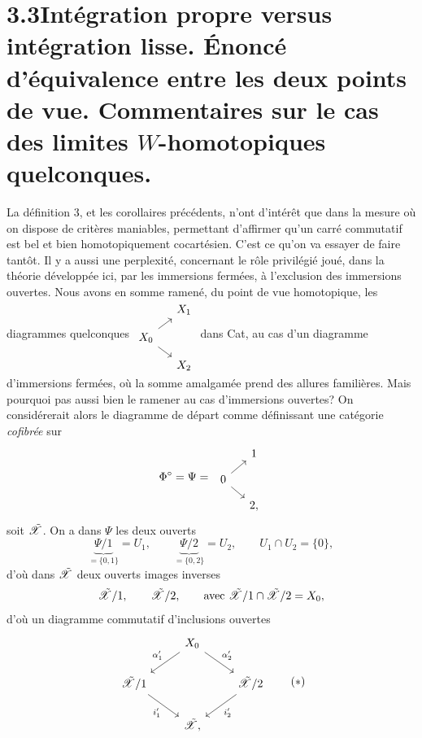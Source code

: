 \section*{3.3\quad Intégration propre versus intégration lisse. Énoncé d'équivalence entre les deux points de vue. Commentaires sur le cas des limites $W$-homotopiques quelconques.}

La définition 3, et les corollaires précédents, n'ont d'intérêt que dans la mesure où on dispose de critères maniables, permettant d'affirmer qu'un carré commutatif est bel et bien homotopiquement cocartésien. C'est ce qu'on va essayer de faire tantôt. Il y a aussi une perplexité, concernant le rôle privilégié joué, dans la théorie développée ici, par les immersions fermées, à l'exclusion des immersions ouvertes. Nous avons en somme ramené, du
point de vue homotopique, les diagrammes quelconques $\begin{tikzcd}[row sep=small, column sep=small]
 & X_1 \\
X_0 \arrow[ur] \arrow[dr] & \\
 & X_2
\end{tikzcd}$ dans Cat, au cas d'un diagramme d'immersions fermées, où la somme amalgamée prend des allures familières. Mais pourquoi pas aussi bien le ramener au cas d'immersions ouvertes? On considérerait alors le diagramme de départ comme définissant une catégorie \textit{cofibrée} sur
\[
\Phi^{\circ} = \Psi = \
\begin{tikzcd}[row sep=small, column sep=small]
 & 1 \\
0 \arrow[ur] \arrow[dr] & \\
 & 2,
\end{tikzcd}
\]
soit $\tilde{\mathscr{X}}$. On a dans $\Psi$ les deux ouverts
\[
\underbrace{\Psi/1}_{=\{0,1\}} = U_1, \qquad \underbrace{\Psi/2}_{=\{0,2\}} = U_2, \qquad U_1 \cap U_2 = \{0\},
\]
d'où dans $\tilde{\mathscr{X}}$ deux ouverts images inverses
\[
\tilde{\mathscr{X}}/1, \qquad \tilde{\mathscr{X}}/2, \qquad \text{avec } \tilde{\mathscr{X}}/1 \cap \tilde{\mathscr{X}}/2 = X_0,
\]
d'où un diagramme commutatif d'inclusions ouvertes
\[
\begin{tikzcd}
 & X_0 \arrow[dl, "\alpha'_1"'] \arrow[dr, "\alpha'_2"] & \\
\tX/1 \arrow[dr, "i'_1"'] & & \tX/2 \arrow[dl, "i'_2"] \\
 & \tX, &
\end{tikzcd}
\tag*{$(*)$}
\]

